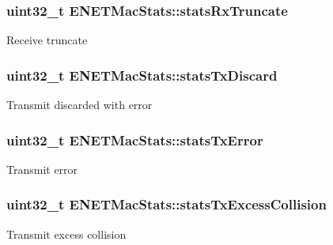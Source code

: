 \subsubsection[{\texorpdfstring{stats\+Rx\+Truncate}{statsRxTruncate}}]{\setlength{\rightskip}{0pt plus 5cm}uint32\+\_\+t E\+N\+E\+T\+Mac\+Stats\+::stats\+Rx\+Truncate}\hypertarget{structENETMacStats_af473e00e212f117337781ac88cdc067a}{}\label{structENETMacStats_af473e00e212f117337781ac88cdc067a}
Receive truncate 
\subsubsection[{\texorpdfstring{stats\+Tx\+Discard}{statsTxDiscard}}]{\setlength{\rightskip}{0pt plus 5cm}uint32\+\_\+t E\+N\+E\+T\+Mac\+Stats\+::stats\+Tx\+Discard}\hypertarget{structENETMacStats_a2d116373873ebaa5aafa16f13fc7f98e}{}\label{structENETMacStats_a2d116373873ebaa5aafa16f13fc7f98e}
Transmit discarded with error 
\subsubsection[{\texorpdfstring{stats\+Tx\+Error}{statsTxError}}]{\setlength{\rightskip}{0pt plus 5cm}uint32\+\_\+t E\+N\+E\+T\+Mac\+Stats\+::stats\+Tx\+Error}\hypertarget{structENETMacStats_a2f97920ade8de4608460e7fc1e883833}{}\label{structENETMacStats_a2f97920ade8de4608460e7fc1e883833}
Transmit error 
\subsubsection[{\texorpdfstring{stats\+Tx\+Excess\+Collision}{statsTxExcessCollision}}]{\setlength{\rightskip}{0pt plus 5cm}uint32\+\_\+t E\+N\+E\+T\+Mac\+Stats\+::stats\+Tx\+Excess\+Collision}\hypertarget{structENETMacStats_a7c8c30ff4fa88537cd4d60ef17c677d8}{}\label{structENETMacStats_a7c8c30ff4fa88537cd4d60ef17c677d8}
Transmit excess collision 
